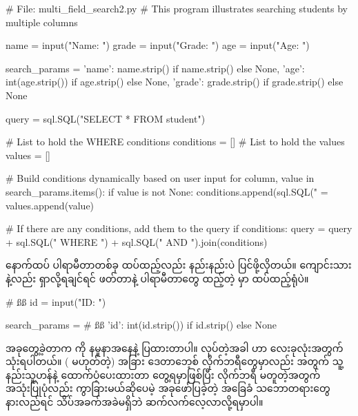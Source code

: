 \begin{py}
# File: multi_field_search2.py
# This program illustrates searching students by multiple columns

name = input("Name: ")
grade = input("Grade: ")
age = input("Age: ")

search_params = {
    'name': name.strip() if name.strip() else None,
    'age': int(age.strip()) if age.strip() else None,
    'grade': grade.strip() if grade.strip() else None
}

query = sql.SQL("SELECT * FROM student")

# List to hold the WHERE conditions
conditions = []
# List to hold the values
values = []

# Build conditions dynamically based on user input
for column, value in search_params.items():
    if value is not None:
        conditions.append(sql.SQL("{} = %
        values.append(value)

# If there are any conditions, add them to the query
if conditions:
    query = query + sql.SQL(" WHERE ") + sql.SQL(" AND ").join(conditions)
\end{py}
%
နောက်ထပ် ပါရာမီတာတစ်ခု ထပ်ထည့်လည်း နည်းနည်းပဲ ပြင်ဖို့လိုတယ်။ ကျောင်းသား  နဲ့လည်း ရှာလို့ရချင်ရင်  ဖတ်တာနဲ့ ပါရာမီတာတွေ ထည့်တဲ့  မှာ ထပ်ထည့်ရုံပဲ။
%
\begin{py}
# ßß
id = input("ID: ")

search_params = {
    # ßß
    'id': int(id.strip()) if id.strip() else None
}
\end{py}
%

အခုတွေ့ခဲ့တာက  ကို နမူနာအနေနဲ့ ပြထားတာပါ။  လုပ်တဲ့အခါ  ဟာ  လေးခုလုံးအတွက် သုံးရပါတယ်။ ( မဟုတ်တဲ့) အခြား ဒေတာဘေ့စ် လိုက်ဘရီတွေမှာလည်း  အတွက် သူ့နည်းသူ့ဟန်နဲ့ ထောက်ပံ့ပေးထားတာ တွေ့ရမှာဖြစ်ပြီး လိုက်ဘရီ မတူတဲ့အတွက် အသုံးပြုပုံလည်း ကွာခြားမယ်ဆိုပေမဲ့  အခုဖော်ပြခဲ့တဲ့ အခြေခံ သဘောတရားတွေ နားလည်ရင် သိပ်အခက်အခဲမရှိဘဲ ဆက်လက်လေ့လာလို့ရမှာပါ။

